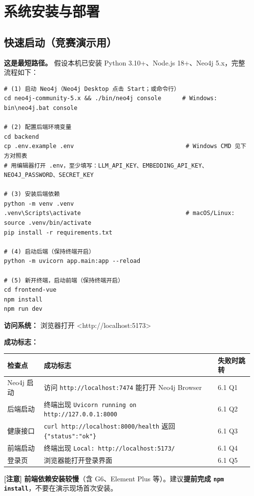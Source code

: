 \documentclass[UTF8,a4paper,11pt]{ctexrep}
\newcommand{\warnmark}{\textcolor{todobar}{\textbf{[注意]}}}
\begin{document}
\chapter{系统安装与部署}


\section{快速启动（竞赛演示用）}

\textbf{这是最短路径。} 假设本机已安装 Python 3.10+、Node.js 18+、Neo4j 5.x，完整流程如下：

\begin{Verbatim}[breaklines=true,breakanywhere=true,fontsize=\small,frame=single,framesep=4pt,rulecolor=\color{codeframe}]
# (1) 启动 Neo4j（Neo4j Desktop 点击 Start；或命令行）
cd neo4j-community-5.x && ./bin/neo4j console      # Windows: bin\neo4j.bat console

# (2) 配置后端环境变量
cd backend
cp .env.example .env                                # Windows CMD 见下方对照表
# 用编辑器打开 .env，至少填写：LLM_API_KEY、EMBEDDING_API_KEY、NEO4J_PASSWORD、SECRET_KEY

# (3) 安装后端依赖
python -m venv .venv
.venv\Scripts\activate                              # macOS/Linux: source .venv/bin/activate
pip install -r requirements.txt

# (4) 启动后端（保持终端开启）
python -m uvicorn app.main:app --reload

# (5) 新开终端，启动前端（保持终端开启）
cd frontend-vue
npm install
npm run dev
\end{Verbatim}

\textbf{访问系统：} 浏览器打开 <http://localhost:5173>

\textbf{成功标志：}

\begin{center}
\small
\begin{tabularx}{\linewidth}{@{}XXX@{}}
\toprule
检查点 & 成功标志 & 失败时跳转 \\
\midrule
Neo4j 启动 & 访问 \texttt{http://localhost:7474} 能打开 Neo4j Browser & 6.1 Q1 \\
后端启动 & 终端出现 \texttt{Uvicorn running on http://127.0.0.1:8000} & 6.1 Q2 \\
健康接口 & \texttt{curl http://localhost:8000/health} 返回 \texttt{\{"status":"ok"\}} & 6.1 Q3 \\
前端启动 & 终端出现 \texttt{Local: http://localhost:5173/} & 6.1 Q4 \\
登录页 & 浏览器能打开登录界面 & 6.1 Q5 \\
\bottomrule
\end{tabularx}
\end{center}
\begin{todobox}
\warnmark{} \textbf{前端依赖安装较慢}（含 G6、Element Plus 等）。建议\textbf{提前完成 \texttt{npm install}}，不要在演示现场首次安装。

\end{todobox}
\end{document}
